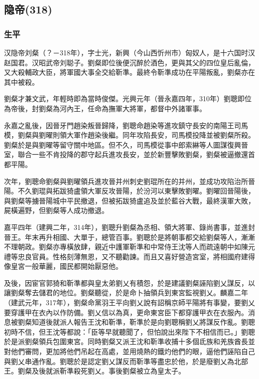 
\subsection{隐帝\tiny(318)}

\subsubsection{生平}

汉隐帝刘粲（？－318年），字士光，新興（今山西忻州市）匈奴人，是十六国时汉赵国君。汉昭武帝刘聪子。劉粲即位後便沉醉於酒色，更與其父的四位皇后亂倫，又大殺輔政大臣，將軍國大事全交給靳準。最終令靳準成功在平陽叛亂，劉粲亦在其中被殺。

劉粲才兼文武，年輕時即為當時俊傑。光興元年（晉永嘉四年，310年）劉聰即位為帝後，封劉粲為河內王，任命為撫軍大將軍，都督中外諸軍事。

永嘉之亂後，因晉牙門趙染叛晉歸降，劉聰命趙染等進攻鎮守長安的南陽王司馬模，劉粲與劉曜則領大軍作趙染後繼。同年攻陷長安，司馬模投降並被劉粲所殺。劉粲於是與劉曜等留守關中地區。但不久，司馬模從事中郎索綝等人圖謀復興晉室，聯合一些不肯投降的郡守起兵進攻長安，並於新豐擊敗劉粲，劉粲被逼撤還首都平陽。

次年，劉聰命劉粲與劉曜領兵進攻晉并州刺史劉琨所在的并州，並成功攻陷治所晉陽。不久劉琨與拓跋猗盧領大軍反攻晉陽，於汾河以東擊敗劉曜。劉曜回晉陽後，與劉粲等擄晉陽城中平民撤退，但被拓跋猗盧追及並於藍谷大戰，最終漢軍大敗，屍橫遍野，但劉粲等人成功撤退。

嘉平四年（建興二年，314年），劉聰升劉粲為丞相、領大將軍、錄尚書事，並進封晉王。年末再升相國、大單于，總管百事。劉聰於是將朝事都交給劉粲等人，漸漸不理朝政。劉粲亦專橫放肆，親近中護軍靳準和中常侍王沈等人而疏遠朝中如陳元禮等忠良官員。性格刻薄無恩，又不聽勸諫。而且又喜好營造宮室，將相國府建得像皇宮一般華麗，國民都開始厭惡他。

及後，因宦官郭猗和靳準都與皇太弟劉乂有積怨，於是建議劉粲誣陷劉乂謀反，以讓劉粲奪去儲君的地位。劉粲聽從，於是命卜抽領兵到東宮監視劉乂。麟嘉二年（建武元年，317年），劉粲命黨羽王平向劉乂說有詔稱京師平陽將有事變，要劉乂要穿護甲在衣內以作防備。劉乂信以為真，更命東宮臣下都穿護甲衣在衣服內。消息被劉粲知道後就派人報告王沈和靳準，靳準於是向劉聰稱劉乂將謀反作亂。劉聰初時不信，但王沈等都說：「臣等早就聽聞了，但怕說出來陛下不相信而已。」劉聰於是派劉粲領兵包圍東宮。同時劉粲又派王沈和靳準收捕十多個氐族和羌族酋長並對他們審問，更加將他們吊起在高處，並用燒熱的鐵灼他們的眼，逼他們誣陷自己與劉乂串通作亂。劉聰於是認定劉乂謀反而靳準等盡忠於他，於是廢劉乂為北部王。劉粲及後就派靳準殺死劉乂。事後劉粲被立為皇太子。

